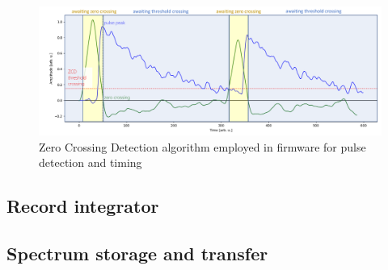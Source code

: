 \begin{figure}[H]
  \centering
  \includegraphics[width=\linewidth]{media/zcd_algorithm.png}
  \caption{Zero Crossing Detection algorithm employed in firmware for pulse detection and timing}
  \label{fig:zcd_algorithm} 
\end{figure}
\subsection{Record integrator}
\subsection{Spectrum storage and transfer}
